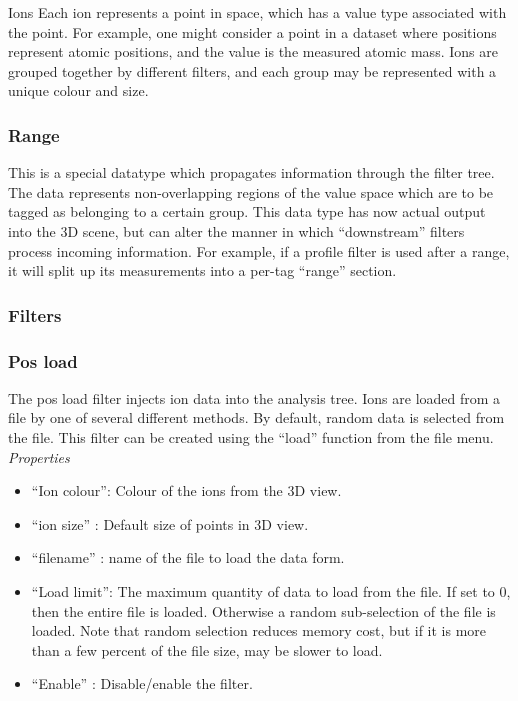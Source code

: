 \documentclass[10pt]{article}
\begin{document}
{Ions Each ion represents a point in space, which has a value type associated with the point. For example, one might consider a point in a dataset where positions represent atomic positions, and the value is the measured atomic mass. Ions are grouped together by different filters, and each group may be represented with a unique colour and size.  

\subsubsection{Range}
This is a special datatype which propagates information through the filter tree. The data represents non-overlapping regions of the value space which are to be tagged as belonging to a certain group. This data type has now actual output into the 3D scene, but can alter the manner in which ``downstream'' filters process incoming information. For example, if a profile filter is used after a range, it will split up its measurements into a per-tag ``range'' section.  
\subsubsection{Filters}
\subsubsection{Pos load}
 
The pos load filter injects ion data into the analysis tree. Ions are loaded from a file by one of several different methods. By default, random data is selected from the file. This filter can be created using the ``load'' function from the file menu.  
\emph{Properties}
\begin{itemize}
\item  ``Ion colour'': Colour of the ions from the 3D view.
\item  ``ion size'' : Default size of points in 3D view.
\item  ``filename'' : name of the file to load the data form.
\item  ``Load limit'': The maximum quantity of data to load from the file. If set to 0, then the entire file is loaded. Otherwise a random sub-selection of the file is loaded. Note that random selection reduces memory cost, but if it is more than a few percent of the file size, may be slower to load.
\item ``Enable'' : Disable/enable the filter.

\end{itemize}
}
\end{document}
